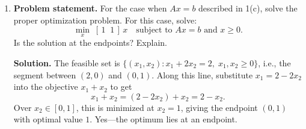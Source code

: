 \documentclass[11pt]{article}
\begin{document}
\begin{enumerate}[label=\textbf{1(\alph*)}]
		\item \textbf{Problem statement.}
		For the case when $Ax = b$ described in 1(c), solve the proper optimization problem. For this case, solve:
		\begin{equation}
			\min_{x}\; [\,1\;\;1\,]\,x
			\quad \text{subject to } Ax = b \text{ and } x \ge 0.
			\label{eq:obj11}
		\end{equation}
		Is the solution at the endpoints? Explain.
		
		\textbf{Solution.}
		The feasible set is $\{(x_1,x_2): x_1+2x_2=2,\; x_1,x_2\ge 0\}$, i.e., the segment between $(2,0)$ and $(0,1)$.
		Along this line, substitute $x_1=2-2x_2$ into the objective $x_1+x_2$ to get
		\[
		x_1 + x_2 = (2 - 2x_2) + x_2 = 2 - x_2.
		\]
		Over $x_2 \in [0,1]$, this is minimized at $x_2=1$, giving the endpoint $(0,1)$ with optimal value $1$.
		Yes—the optimum lies at an endpoint.
		
	\end{enumerate}
	
	
\end{document}
